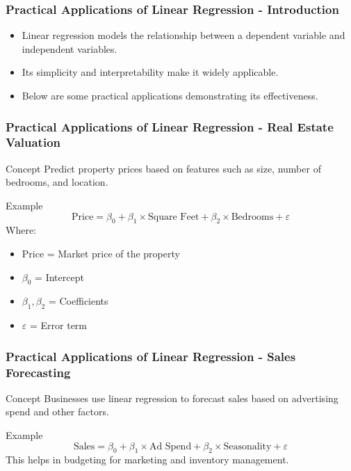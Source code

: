 \documentclass[aspectratio=169]{beamer}
\begin{document}
\begin{frame}[fragile]
    \frametitle{Practical Applications of Linear Regression - Introduction}
    \begin{itemize}
        \item Linear regression models the relationship between a dependent variable and independent variables.
        \item Its simplicity and interpretability make it widely applicable.
        \item Below are some practical applications demonstrating its effectiveness.
    \end{itemize}
\end{frame}

\begin{frame}[fragile]
    \frametitle{Practical Applications of Linear Regression - Real Estate Valuation}
    \begin{block}{Concept}
        Predict property prices based on features such as size, number of bedrooms, and location.
    \end{block}
    \begin{block}{Example}
        \[
        \text{Price} = \beta_0 + \beta_1 \times \text{Square Feet} + \beta_2 \times \text{Bedrooms} + \varepsilon
        \]
        Where:
        \begin{itemize}
            \item \( \text{Price} \) = Market price of the property
            \item \( \beta_0 \) = Intercept
            \item \( \beta_1, \beta_2 \) = Coefficients
            \item \( \varepsilon \) = Error term
        \end{itemize}
    \end{block}
\end{frame}

\begin{frame}[fragile]
    \frametitle{Practical Applications of Linear Regression - Sales Forecasting}
    \begin{block}{Concept}
        Businesses use linear regression to forecast sales based on advertising spend and other factors.
    \end{block}
    \begin{block}{Example}
        \[
        \text{Sales} = \beta_0 + \beta_1 \times \text{Ad Spend} + \beta_2 \times \text{Seasonality} + \varepsilon
        \]
        This helps in budgeting for marketing and inventory management.
    \end{block}
\end{frame}
\end{document}
